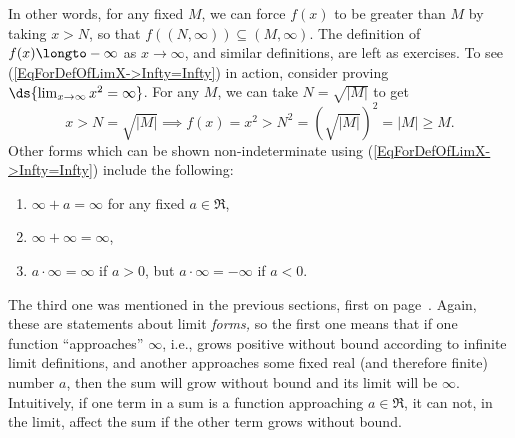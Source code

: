 In other words, for any fixed $M$, we can force $f(x)$ to
be greater than $M$ by taking $x>N$, so that
$f((N,\infty))\subseteq(M,\infty)$.
The definition of $f(x)\longto-\infty$ as $x\to\infty$,
and similar definitions, are left as exercises.
To see (\ref{EqForDefOfLimX->Infty=Infty}) in action, consider
proving $\ds{\lim_{x\to\infty}x^2=\infty}$.  For any $M$,
we can take $N=\sqrt{|M|}$
to get
$$x>N=\sqrt{|M|}\implies
f(x)=x^2>N^2=\left(\sqrt{|M|}\right)^2=|M|\ge M.$$
Other forms which can be shown non-indeterminate using
(\ref{EqForDefOfLimX->Infty=Infty})
include the following:
\begin{enumerate}
\item $\infty+a=\infty$ for any fixed $a\in\Re$,
\item $\infty+\infty=\infty$,
\item $a\cdot\infty=\infty$ if $a>0$, but $a\cdot\infty=-\infty$
      if $a<0$.
\end{enumerate}
The third one was mentioned
in the previous sections, first on page~\pageref{4CdotInfty}.
Again, these are statements about limit {\it forms,} so
the first one means that if one function ``approaches'' $\infty$,
i.e., grows positive without bound according to infinite
limit definitions, 
and another approaches some fixed real (and therefore finite) 
number $a$, then
the sum will grow without bound and its limit will be $\infty$.
Intuitively, if one term in a sum is
a function approaching $a\in\Re$, it can not, in the limit,
affect the sum if the other term grows without bound.


